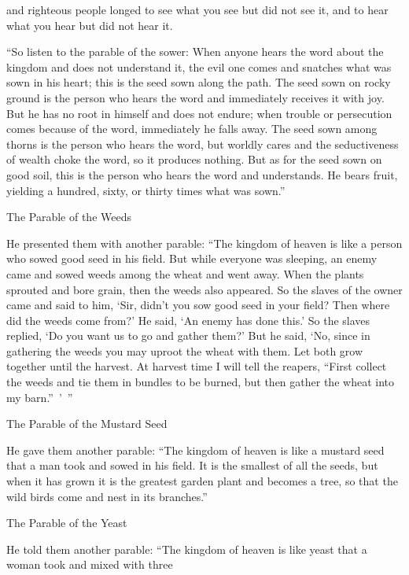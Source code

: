 {and
righteous people
longed
to see
what
you see
but
did
not
see
it, and
to hear
what
you hear
but
did
not
hear it.
\par }{\PP {}“So
listen
to the parable
of the sower:
When
anyone
hears
the word
about the kingdom
and
does
not
understand
it, the evil one
comes
and
snatches
what was sown
in
his
heart;
this
is
the seed sown
along
the path.
The seed sown
on
rocky ground
is
the person
who hears
the word
and
immediately
receives
it
with
joy.
But
he has
no
root
in
himself
and
does
not endure;
when trouble
or
persecution
comes
because
of the word,
immediately
he falls away.
The
seed sown
among
thorns
is
the person who hears
the word,
but
worldly
cares
and
the seductiveness
of wealth
choke
the word,
so
it produces nothing.
But
as for the seed sown
on
good
soil,
this
is
the person who hears
the word
and
understands.
He bears fruit,
yielding
a hundred,
sixty,
or thirty times what was sown.”
\par }{\SH The Parable of the Weeds
\par }{\PP {}He presented
them
with another
parable: “The kingdom
of heaven
is like
a person
who sowed
good
seed
in
his
field.
But
while everyone
was sleeping,
an enemy
came
and
sowed
weeds
among
the wheat
and
went away.
When
the plants
sprouted
and
bore
grain,
then
the weeds
also
appeared.
So
the slaves
of the owner
came
and said
to him,
‘Sir,
didn’t
you sow
good
seed
in
your
field? Then
where
did
the weeds
come from?’
He said,
‘An enemy
has done
this.’
So
the slaves replied,
‘Do you want
us to go
and gather
them?’
But
he said,
‘No,
since in
gathering
the weeds
you may uproot
the wheat
with
them.
Let
both
grow together
until
the harvest.
At
harvest
time
I will tell
the reapers,
“First
collect
the weeds
and
tie
them
in
bundles
to
be burned,
but
then gather
the wheat
into
my
barn.” ’ ”
\par }{\SH The Parable of the Mustard Seed
\par }{\PP {}He gave
them
another
parable: “The kingdom
of heaven
is
like
a mustard seed
that
a man
took
and sowed
in
his
field.
It is
the smallest
of all
the seeds,
but
when
it has grown
it is
the greatest
garden
plant and
becomes
a tree,
so that
the wild birds
come
and
nest
in
its
branches.”
\par }{\SH The Parable of the Yeast
\par }{\PP {}He told
them
another
parable: “The kingdom
of heaven
is
like
yeast
that
a woman
took
and mixed
with
three
}
